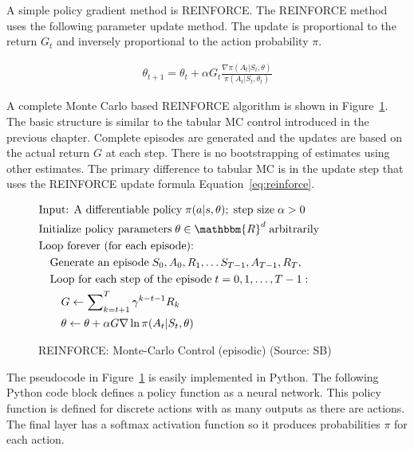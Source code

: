 A simple policy gradient method is REINFORCE. The REINFORCE method uses the following parameter update method. The update is proportional to the return $G_t$ and inversely proportional to the action probability $\pi$. 

\begin{align}
\theta_{t+1} = \theta_t + \alpha G_t \frac{\nabla \pi(A_t | S_t, \theta)}{\pi(A_t | S_t, \theta_t)} \label{eq:reinforce}
\end{align}

A complete Monte Carlo based REINFORCE algorithm is shown in Figure~\ref{fig:reinforce}. The basic structure is similar to the tabular MC control introduced in the previous chapter. Complete episodes are generated and the updates are based on the actual return $G$ at each step. There is no bootstrapping of estimates using other estimates. The primary difference to tabular MC is in the update step that uses the REINFORCE update formula Equation~\ref{eq:reinforce}.

\begin{figure}
\small
\begin{pseudocodebox}
\vspace{-\baselineskip}
\begin{align*}
& \text{Input: A differentiable policy}\;\pi(a | s, \theta);\;\text{step size}\; \alpha > 0 \\
& \text{Initialize policy parameters}\; \theta \in \mathbbm{R}^d\;\text{arbitrarily} \\
& \text{Loop forever (for each episode):} \\
& \quad \text{Generate an episode}\; S_0, A_0, R_1, \ldots S_{T-1}, A_{T-1}, R_T, \hspace{1in} \\
& \quad \text{Loop for each step of the episode}\;t=0, 1, \ldots, T-1:\\
& \quad \quad G \leftarrow \sum\nolimits_{k=t+1}^T \gamma^{k - t - 1}R_k \\
& \quad \quad \theta \leftarrow \theta + \alpha G \nabla \ln \pi(A_t | S_t, \theta)
\end{align*}
\end{pseudocodebox}
\caption[REINFORCE: Monte-Carlso Control]{REINFORCE: Monte-Carlo Control (episodic) (Source: SB)}
\label{fig:reinforce}
\end{figure}

The pseudocode in Figure~\ref{fig:reinforce} is easily implemented in Python. The following Python code block defines a policy function as a neural network. This policy function is defined for discrete actions with as many outputs as there are actions. The final layer has a softmax activation function so it produces probabilities $\pi$ for each action.

